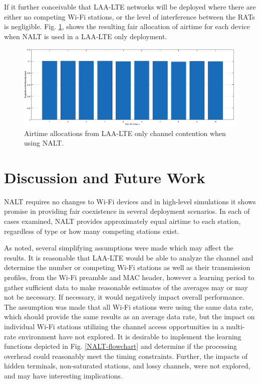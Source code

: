 If it further conceivable that LAA-LTE networks will be deployed where there are either no competing Wi-Fi stations, or the level of interference between the RATs is negligible.  Fig. \ref{NALT-only-results}, shows the resulting fair allocation of airtime for each device when NALT is used in a LAA-LTE only deployment. 
\begin{figure}[H]
	\includegraphics[width=\textwidth]{figures3/LAAonly}
	\caption{Airtime allocations from LAA-LTE only channel contention when using NALT.}
	\label{NALT-only-results}%
\end{figure}

\section{Discussion and Future Work}
\label{future-work}
NALT requires no changes to \mbox{Wi-Fi} devices and in high-level simulations it shows promise in providing fair coexistence in several deployment scenarios.  In each of cases examined, NALT provides approximately equal airtime to each station, regardless of type or how many competing stations exist.  

As noted, several simplifying assumptions were made which may affect the results.  It is reasonable that \mbox{LAA-LTE} would be able to analyze the channel and determine the number or competing \mbox{Wi-Fi} stations as well as their transmission profiles, from the \mbox{Wi-Fi} preamble and MAC header, however a learning period to gather sufficient data to make reasonable estimates of the averages may or may not be necessary.  If necessary, it would negatively impact overall performance.  The assumption was made that all \mbox{Wi-Fi} stations were using the same data rate, which should provide the same results as an average data rate, but the impact on individual \mbox{Wi-Fi} stations utilizing the channel access opportunities in a multi-rate environment have not explored.  It is desirable to implement the learning functions depicted in Fig. \ref{NALT-flowchart} and determine if the processing overhead could reasonably meet the timing constraints. Further, the impacts of hidden terminals, non-saturated stations, and lossy channels, were not explored, and may have interesting implications. 

